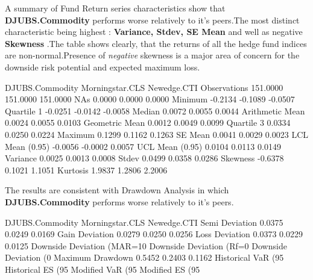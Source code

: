 \documentclass[12pt,letterpaper,english]{article}
\begin{document}
A summary of Fund Return series characteristics show that \textbf{DJUBS.Commodity} performs worse relatively to it's peers.The most distinct characteristic being highest : \textbf{Variance, Stdev, SE Mean} and well as negative \textbf{Skewness} .The table shows clearly, that the returns of all the hedge fund indices are non-normal.Presence of \emph{negative} skewness is a major area of concern for the downside risk potential and expected maximum loss.

\begin{Schunk}
\begin{Soutput}
                DJUBS.Commodity Morningstar.CLS Newedge.CTI
Observations           151.0000        151.0000    151.0000
NAs                      0.0000          0.0000      0.0000
Minimum                 -0.2134         -0.1089     -0.0507
Quartile 1              -0.0251         -0.0142     -0.0058
Median                   0.0072          0.0055      0.0044
Arithmetic Mean          0.0024          0.0055      0.0103
Geometric Mean           0.0012          0.0049      0.0099
Quartile 3               0.0334          0.0250      0.0224
Maximum                  0.1299          0.1162      0.1263
SE Mean                  0.0041          0.0029      0.0023
LCL Mean (0.95)         -0.0056         -0.0002      0.0057
UCL Mean (0.95)          0.0104          0.0113      0.0149
Variance                 0.0025          0.0013      0.0008
Stdev                    0.0499          0.0358      0.0286
Skewness                -0.6378          0.1021      1.1051
Kurtosis                 1.9837          1.2806      2.2006
\end{Soutput}
\end{Schunk}


The results are consistent with Drawdown Analysis in which \textbf{DJUBS.Commodity} performs worse relatively to it's peers.

\begin{Schunk}
\begin{Soutput}
                             DJUBS.Commodity Morningstar.CLS Newedge.CTI
Semi Deviation                        0.0375          0.0249      0.0169
Gain Deviation                        0.0279          0.0250      0.0256
Loss Deviation                        0.0373          0.0229      0.0125
Downside Deviation (MAR=10%
Downside Deviation (Rf=0%
Downside Deviation (0%
Maximum Drawdown                      0.5452          0.2403      0.1162
Historical VaR (95%
Historical ES (95%
Modified VaR (95%
Modified ES (95%
\end{Soutput}
\end{Schunk}
\end{document}
